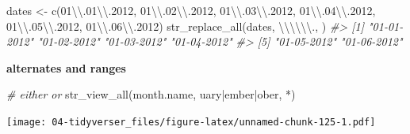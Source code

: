 \documentclass[
]{book}
\newenvironment{Shaded}{\begin{snugshade}}{\end{snugshade}}
\newcommand{\CommentTok}[1]{\textcolor[rgb]{0.56,0.35,0.01}{\textit{#1}}}
\newcommand{\FunctionTok}[1]{\textcolor[rgb]{0.00,0.00,0.00}{#1}}
\newcommand{\NormalTok}[1]{#1}
\newcommand{\OtherTok}[1]{\textcolor[rgb]{0.56,0.35,0.01}{#1}}
\newcommand{\SpecialCharTok}[1]{\textcolor[rgb]{0.00,0.00,0.00}{#1}}
\newcommand{\StringTok}[1]{\textcolor[rgb]{0.31,0.60,0.02}{#1}}
\begin{document}
\begin{Shaded}
\begin{Highlighting}[]
\NormalTok{dates }\OtherTok{\textless{}{-}} \FunctionTok{c}\NormalTok{(}\StringTok{\textquotesingle{}01}\SpecialCharTok{\textbackslash{}\textbackslash{}}\StringTok{.01}\SpecialCharTok{\textbackslash{}\textbackslash{}}\StringTok{.2012\textquotesingle{}}\NormalTok{, }\StringTok{\textquotesingle{}01}\SpecialCharTok{\textbackslash{}\textbackslash{}}\StringTok{.02}\SpecialCharTok{\textbackslash{}\textbackslash{}}\StringTok{.2012\textquotesingle{}}\NormalTok{, }\StringTok{\textquotesingle{}01}\SpecialCharTok{\textbackslash{}\textbackslash{}}\StringTok{.03}\SpecialCharTok{\textbackslash{}\textbackslash{}}\StringTok{.2012\textquotesingle{}}\NormalTok{, }\StringTok{\textquotesingle{}01}\SpecialCharTok{\textbackslash{}\textbackslash{}}\StringTok{.04}\SpecialCharTok{\textbackslash{}\textbackslash{}}\StringTok{.2012\textquotesingle{}}\NormalTok{, }\StringTok{\textquotesingle{}01}\SpecialCharTok{\textbackslash{}\textbackslash{}}\StringTok{.05}\SpecialCharTok{\textbackslash{}\textbackslash{}}\StringTok{.2012\textquotesingle{}}\NormalTok{, }\StringTok{\textquotesingle{}01}\SpecialCharTok{\textbackslash{}\textbackslash{}}\StringTok{.06}\SpecialCharTok{\textbackslash{}\textbackslash{}}\StringTok{.2012\textquotesingle{}}\NormalTok{)}
\FunctionTok{str\_replace\_all}\NormalTok{(dates, }\StringTok{\textquotesingle{}}\SpecialCharTok{\textbackslash{}\textbackslash{}\textbackslash{}\textbackslash{}\textbackslash{}\textbackslash{}}\StringTok{.\textquotesingle{}}\NormalTok{, }\StringTok{\textquotesingle{}{-}\textquotesingle{}}\NormalTok{)}
\CommentTok{\#\textgreater{} [1] "01{-}01{-}2012" "01{-}02{-}2012" "01{-}03{-}2012" "01{-}04{-}2012"}
\CommentTok{\#\textgreater{} [5] "01{-}05{-}2012" "01{-}06{-}2012"}
\end{Highlighting}
\end{Shaded}

\textbf{alternates and ranges}

\begin{Shaded}
\begin{Highlighting}[]
\CommentTok{\# either or}
\FunctionTok{str\_view\_all}\NormalTok{(month.name, }\StringTok{\textquotesingle{}uary|ember|ober\textquotesingle{}}\NormalTok{, }\StringTok{\textquotesingle{}*\textquotesingle{}}\NormalTok{)}
\end{Highlighting}
\end{Shaded}

\texttt{[image: 04-tidyverser\_files/figure-latex/unnamed-chunk-125-1.pdf]}
\end{document}
